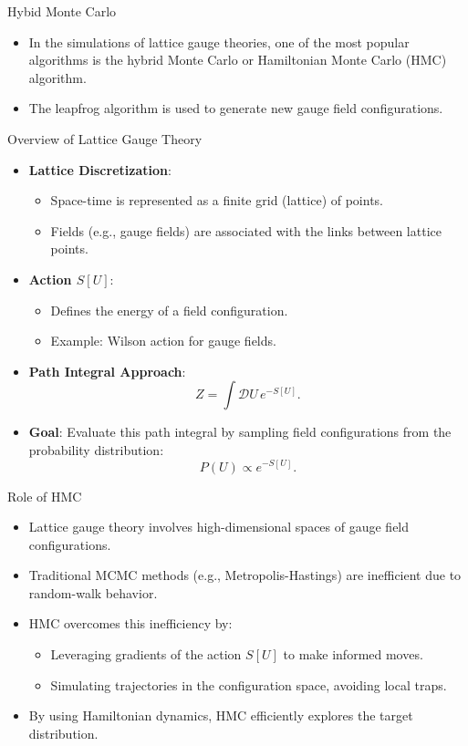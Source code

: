 \documentclass{beamer}
\begin{document}
 \begin{frame}{Hybid Monte Carlo}
  \begin{itemize}
    \item In the simulations of lattice gauge theories,  one of the most popular algorithms is the hybrid Monte Carlo or Hamiltonian Monte Carlo (HMC) algorithm.
    \item The leapfrog algorithm is used to generate new gauge field configurations.
  \end{itemize}
 \end{frame}
 \begin{frame}{Overview of Lattice Gauge Theory}
  \begin{itemize}
      \item \textbf{Lattice Discretization}:
      \begin{itemize}
          \item Space-time is represented as a finite grid (lattice) of points.
          \item Fields (e.g., gauge fields) are associated with the links between lattice points.
      \end{itemize}
      \item \textbf{Action \(S[U]\)}:
      \begin{itemize}
          \item Defines the energy of a field configuration.
          \item Example: Wilson action for gauge fields.
      \end{itemize}
      \item \textbf{Path Integral Approach}:
      \[
      Z = \int \mathcal{D}U \, e^{-S[U]}.
      \]
      \item \textbf{Goal}: Evaluate this path integral by sampling field configurations from the probability distribution:
      \[
      P(U) \propto e^{-S[U]}.
      \]
  \end{itemize}
\end{frame}

\begin{frame}{Role of HMC}
  \begin{itemize}
      \item Lattice gauge theory involves high-dimensional spaces of gauge field configurations.
      \item Traditional MCMC methods (e.g., Metropolis-Hastings) are inefficient due to random-walk behavior.
      \item HMC overcomes this inefficiency by:
      \begin{itemize}
          \item Leveraging gradients of the action \(S[U]\) to make informed moves.
          \item Simulating trajectories in the configuration space, avoiding local traps.
      \end{itemize}
      \item By using Hamiltonian dynamics, HMC efficiently explores the target distribution.
  \end{itemize}
\end{frame}
\end{document}

